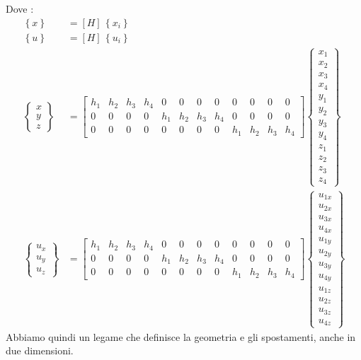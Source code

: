Dove :
\begin{align*}
 \left\{x \right\} &= [H] \,\left\{x_i \right\}\\
    \left\{u \right\} &= [H] \,\left\{u_i \right\}\\
    \begin{Bmatrix}
        x\\y\\z
    \end{Bmatrix}&=
    \left[\begin{array}{cccccccccccc}
        h_1 & h_2 & h_3 & h_4 & 0 & 0 & 0 & 0 & 0 & 0 & 0 & 0\\
        0 & 0 & 0 & 0 & h_1 & h_2 & h_3 & h_4 & 0 & 0 & 0 & 0\\
        0 & 0 & 0 & 0 & 0 & 0 & 0 & 0 & h_1 & h_2 & h_3 & h_4
    \end{array}\right]
    \begin{Bmatrix}
        x_1\\x_2\\x_3\\x_4\\y_1\\y_2\\y_3\\y_4\\z_1\\z_2\\z_3\\z_4
    \end{Bmatrix}\\
    \begin{Bmatrix}
        u_x\\u_y\\u_z
    \end{Bmatrix}&=
    \left[\begin{array}{cccccccccccc}
        h_1 & h_2 & h_3 & h_4 & 0 & 0 & 0 & 0 & 0 & 0 & 0 & 0\\
        0 & 0 & 0 & 0 & h_1 & h_2 & h_3 & h_4 & 0 & 0 & 0 & 0\\
        0 & 0 & 0 & 0 & 0 & 0 & 0 & 0 & h_1 & h_2 & h_3 & h_4
    \end{array}\right]
    \begin{Bmatrix}
        u_{1x}\\u_{2x}\\u_{3x}\\u_{4x}\\u_{1y}\\u_{2y}\\u_{3y}\\u_{4y}\\u_{1z}\\u_{2z}\\u_{3z}\\u_{4z}
    \end{Bmatrix}
\end{align*}
Abbiamo quindi un legame che definisce la geometria e gli spostamenti, anche in due dimensioni.
 
